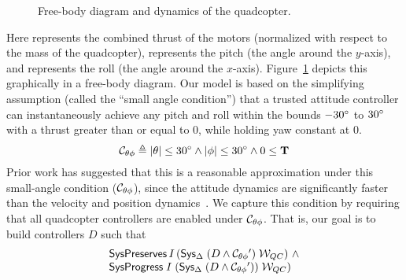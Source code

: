 \begin{figure}


\caption{Free-body diagram and dynamics of the quadcopter.}
\label{fig:free-body}
\end{figure}

Here  represents the combined thrust of the motors (normalized
with respect to the mass of the quadcopter), \tlavar{\pitch} represents the
pitch (the angle around the $y$-axis), and \tlavar{\roll} represents the
roll (the angle around the $x$-axis). Figure~\ref{fig:free-body} depicts
this graphically in a free-body diagram. Our model is based on the
simplifying assumption (called the ``small angle condition'') that a
trusted attitude controller can instantaneously achieve any pitch and roll
within the bounds $-30^{\circ}$ to $30^{\circ}$ with a thrust greater
than or equal to 0, while holding yaw constant at 0.
\[
\mathcal{C}_{\theta\phi} \triangleq \left| \mathbf{\theta} \right| \leq 30^{\circ} \wedge \left|\mathbf{\phi}\right| \leq 30^{\circ} \wedge 0 \leq \mathbf{T}
\]
Prior work has suggested that this is a reasonable approximation under this
small-angle condition ($\mathcal{C}_{\theta\phi}$), since the attitude dynamics are
significantly faster than the velocity and position
dynamics~\cite{Gillula2011}.  We capture this condition by requiring that
all quadcopter controllers are enabled under $\mathcal{C}_{\theta\phi}$.  That is, our
goal is to build controllers $D$ such that
\[
\begin{array}{l}
\mathsf{SysPreserves}\,I\,({\textsf{Sys}}{}_{\Delta}\;(D\wedge\mathcal{C}_{\theta\phi}{}^\prime)\;\mathcal{W}_{QC})~\wedge \\
\mathsf{SysProgress{}}\;I\;({\textsf{Sys}}{}_{\Delta}\;(D\wedge\mathcal{C}_{\theta\phi}{}^\prime))\;\mathcal{W}_{QC})
\end{array}
\]

